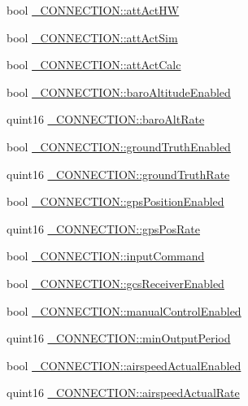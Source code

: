 \begin{DoxyCompactItemize}
bool \hyperlink{group___h_i_t_l_plugin_ga4e0f8f54388f25df1142b8f895a4b445}{\-\_\-\-C\-O\-N\-N\-E\-C\-T\-I\-O\-N\-::att\-Act\-H\-W}
\item 
bool \hyperlink{group___h_i_t_l_plugin_ga8620f5c9256ac5988861939a70fde264}{\-\_\-\-C\-O\-N\-N\-E\-C\-T\-I\-O\-N\-::att\-Act\-Sim}
\item 
bool \hyperlink{group___h_i_t_l_plugin_gab40adc150ae79f115f2680cdf131b41d}{\-\_\-\-C\-O\-N\-N\-E\-C\-T\-I\-O\-N\-::att\-Act\-Calc}
\item 
bool \hyperlink{group___h_i_t_l_plugin_ga6700d3be0f4ef9211d6f34569034b7a8}{\-\_\-\-C\-O\-N\-N\-E\-C\-T\-I\-O\-N\-::baro\-Altitude\-Enabled}
\item 
quint16 \hyperlink{group___h_i_t_l_plugin_gab5b66abe21b9a0f00b2dc2bbb28cac6c}{\-\_\-\-C\-O\-N\-N\-E\-C\-T\-I\-O\-N\-::baro\-Alt\-Rate}
\item 
bool \hyperlink{group___h_i_t_l_plugin_ga7da92539dd2e9e4aeb94b848dc464b11}{\-\_\-\-C\-O\-N\-N\-E\-C\-T\-I\-O\-N\-::ground\-Truth\-Enabled}
\item 
quint16 \hyperlink{group___h_i_t_l_plugin_ga46aa73f7e222771afe3b547bca31eacb}{\-\_\-\-C\-O\-N\-N\-E\-C\-T\-I\-O\-N\-::ground\-Truth\-Rate}
\item 
bool \hyperlink{group___h_i_t_l_plugin_gaec1f5b5cc3ce18186907fde4c9c990b3}{\-\_\-\-C\-O\-N\-N\-E\-C\-T\-I\-O\-N\-::gps\-Position\-Enabled}
\item 
quint16 \hyperlink{group___h_i_t_l_plugin_ga2904afd635e416ec6fca4b3b6bb8679f}{\-\_\-\-C\-O\-N\-N\-E\-C\-T\-I\-O\-N\-::gps\-Pos\-Rate}
\item 
bool \hyperlink{group___h_i_t_l_plugin_gaef59cc30b3dc3c996cfba35065d250bd}{\-\_\-\-C\-O\-N\-N\-E\-C\-T\-I\-O\-N\-::input\-Command}
\item 
bool \hyperlink{group___h_i_t_l_plugin_ga2e4de2a270dafeeadda687a7fc6fb817}{\-\_\-\-C\-O\-N\-N\-E\-C\-T\-I\-O\-N\-::gcs\-Receiver\-Enabled}
\item 
bool \hyperlink{group___h_i_t_l_plugin_gac67de1b6ac74a48c592f55fd17e06ad8}{\-\_\-\-C\-O\-N\-N\-E\-C\-T\-I\-O\-N\-::manual\-Control\-Enabled}
\item 
quint16 \hyperlink{group___h_i_t_l_plugin_ga11d8608f07438f05d1950aa62f774d0c}{\-\_\-\-C\-O\-N\-N\-E\-C\-T\-I\-O\-N\-::min\-Output\-Period}
\item 
bool \hyperlink{group___h_i_t_l_plugin_ga8fc341e96193fe41625a04a534a16387}{\-\_\-\-C\-O\-N\-N\-E\-C\-T\-I\-O\-N\-::airspeed\-Actual\-Enabled}
\item 
quint16 \hyperlink{group___h_i_t_l_plugin_gacb3c852192e75845b2a17679c94a10c1}{\-\_\-\-C\-O\-N\-N\-E\-C\-T\-I\-O\-N\-::airspeed\-Actual\-Rate}

\end{DoxyCompactItemize}
